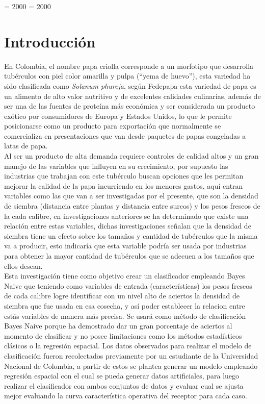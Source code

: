 \righthyphenmin = 2000
\lefthyphenmin = 2000

\chapter*{Introducci\'on}

En Colombia, el nombre papa criolla corresponde a un morfotipo que desarrolla tubérculos con piel color amarilla y pulpa ("`yema de huevo"'), esta variedad ha sido clasificada como \textit{Solanum phureja}, según Fedepapa esta variedad de papa es un alimento de alto valor nutritivo y de excelentes calidades culinarias, además de ser una de las fuentes de proteína más económica y ser considerada un producto exótico por consumidores de Europa y Estados Unidos, lo que le permite posicionarse como un producto para exportación que normalmente se comercializa en presentaciones que van desde paquetes de papas congeladas a latas de papa.\\

Al ser un producto de alta demanda requiere controles de calidad altos y un gran manejo de las variables que influyen en su crecimiento, por supuesto las industrias que trabajan con este tubérculo buscan opciones que les permitan mejorar la calidad de la papa incurriendo en los menores gastos, aquí entran variables como las que van a ser investigadas por el presente, que son la densidad de siembra (distancia entre plantas y distancia entre surcos) y los pesos frescos de la cada calibre, en investigaciones anteriores se ha determinado que existe una relación entre estas variables, dichas investigaciones señalan que la densidad de siembra tiene un efecto sobre los tamaños y cantidad de tubérculos que la misma va a producir, esto indicaría que esta variable podría ser usada por industrias para obtener la mayor cantidad de tubérculos que se adecuen a los tamaños que ellos desean. \\

Esta investigación tiene como objetivo crear un clasificador empleando Bayes Naive que teniendo como variables de entrada (características) los pesos frescos de cada calibre logre identificar con un nivel alto de aciertos la densidad de siembra que fue usada en esa cosecha, y así poder establecer la relacion entre estás variables de manera más precisa. Se usará como método de clasificación Bayes Naive porque ha demostrado dar un gran porcentaje de aciertos al momento de clasificar y no posee limitaciones como los métodos estadísticos clásicos o la regresión espacial. Los datos observados para realizar el modelo de clasificación fueron recolectados previamente por un estudiante de la Universidad Nacional de Colombia, a partir de estos se plantea generar un modelo empleando regresión espacial con el cual se pueda generar datos artificiales, para luego realizar el clasificador con ambos conjuntos de datos y evaluar cual se ajusta mejor evaluando la curva característica operativa del receptor para cada caso.\\ 

